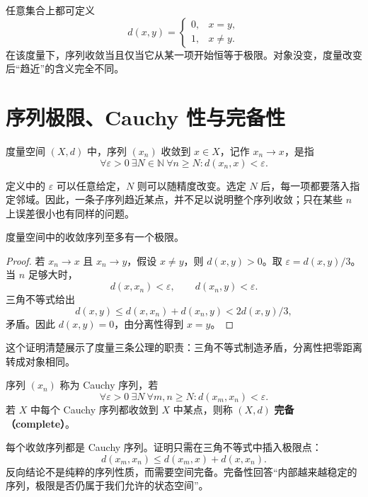 \begin{example}[离散度量]
任意集合上都可定义
\[
 d(x,y)=\begin{cases}0,&x=y,\\1,&x\ne y.\end{cases}
\]
在该度量下，序列收敛当且仅当它从某一项开始恒等于极限。对象没变，度量改变后“趋近”的含义完全不同。
\end{example}

\section{序列极限、Cauchy 性与完备性}

\begin{definition}[序列极限]
度量空间 $(X,d)$ 中，序列 $(x_n)$ 收敛到 $x\in X$，记作 $x_n\to x$，是指
\[
  \forall\varepsilon>0\ \exists N\in\mathbb N\ \forall n\geq N:
  d(x_n,x)<\varepsilon.
\]
\end{definition}

定义中的 $\varepsilon$ 可以任意给定，$N$ 则可以随精度改变。选定 $N$ 后，每一项都要落入指定邻域。因此，一条子序列趋近某点，并不足以说明整个序列收敛；只在某些 $n$ 上误差很小也有同样的问题。


\begin{proposition}
度量空间中的收敛序列至多有一个极限。
\end{proposition}

\begin{proof}
若 $x_n\to x$ 且 $x_n\to y$，假设 $x\ne y$，则 $d(x,y)>0$。取 $\varepsilon=d(x,y)/3$。当 $n$ 足够大时，
\[
 d(x,x_n)<\varepsilon,\qquad d(x_n,y)<\varepsilon.
\]
三角不等式给出
\[
 d(x,y)\leq d(x,x_n)+d(x_n,y)<2d(x,y)/3,
\]
矛盾。因此 $d(x,y)=0$，由分离性得到 $x=y$。
\end{proof}

这个证明清楚展示了度量三条公理的职责：三角不等式制造矛盾，分离性把零距离转成对象相同。


\begin{definition}
序列 $(x_n)$ 称为 Cauchy 序列，若
\[
  \forall\varepsilon>0\ \exists N\ \forall m,n\geq N:
  d(x_m,x_n)<\varepsilon.
\]
若 $X$ 中每个 Cauchy 序列都收敛到 $X$ 中某点，则称 $(X,d)$ \textbf{完备（complete）}。
\end{definition}

每个收敛序列都是 Cauchy 序列。证明只需在三角不等式中插入极限点：
\[
 d(x_m,x_n)\leq d(x_m,x)+d(x,x_n).
\]
反向结论不是纯粹的序列性质，而需要空间完备。完备性回答“内部越来越稳定的序列，极限是否仍属于我们允许的状态空间”。

